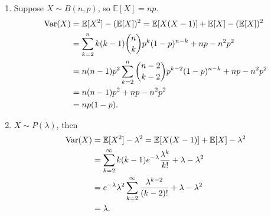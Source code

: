 \begin{example}
    \begin{enumerate}
        \item Suppose $ X\sim B(n,p) $, so $ \mathbb{E}[X]=np $.
        \begin{align*}
            \operatorname{Var}(X) &= \mathbb{E}[X^2]-(\mathbb{E}[X])^2 = \mathbb{E}[X(X-1)]+\mathbb{E}[X]-(\mathbb{E}[X])^2\\ 
            &= \sum_{k=2}^{n}k(k-1) \binom{n}{k}p^k (1-p)^{n-k} +np-n^2p^2\\ 
            &= n(n-1)p^2 \sum_{k=2}^{n}\binom{n-2}{k-2}p^{k-2}(1-p)^{n-k}+np-n^2p^2\\ 
            &= n(n-1)p^2+np-n^2p^2\\ 
            &= np(1-p).
        \end{align*}
        \item $ X\sim P(\lambda) $, then 
        \begin{align*}
            \operatorname{Var}(X) &= \mathbb{E}[X^2]-\lambda^2 = \mathbb{E}[X(X-1)]+\mathbb{E}[X]-\lambda^2\\ 
            &= \sum_{k=2}^{\infty} k(k-1)e^{-\lambda}\frac{\lambda^k}{k!}+\lambda-\lambda^2\\ 
            &= e^{-\lambda}\lambda^2\sum_{k=2}^{\infty}\frac{\lambda^{k-2}}{(k-2)!}+\lambda-\lambda^2\\ 
            &= \lambda.
        \end{align*}
    \end{enumerate}
\end{example}

